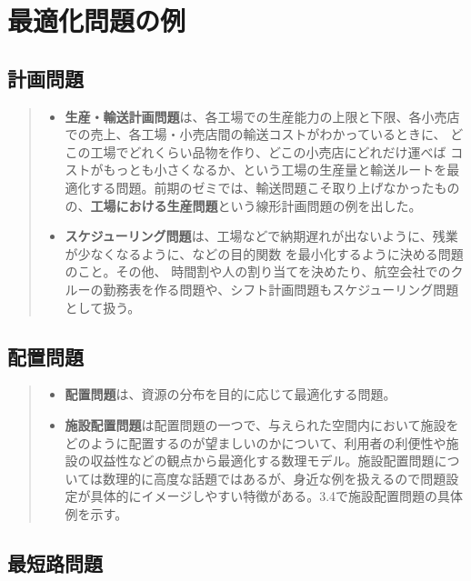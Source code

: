 \documentclass{jsarticle}
\begin{document}
\section{最適化問題の例}
\subsection{計画問題}
\begin{quote}
 	\begin{itemize}
 		 \item {\bf 生産・輸送計画問題}は、各工場での生産能力の上限と下限、各小売店での売上、各工場・小売店間の輸送コストがわかっているときに、 どこの工場でどれくらい品物を作り、どこの小売店にどれだけ運べば コストがもっとも小さくなるか、という工場の生産量と輸送ルートを最適化する問題。前期のゼミでは、輸送問題こそ取り上げなかったものの、{\bf 工場における生産問題}という線形計画問題の例を出した。
 		 \item {\bf スケジューリング問題}は、工場などで納期遅れが出ないように、残業が少なくなるように、などの目的関数 を最小化するように決める問題のこと。その他、 時間割や人の割り当てを決めたり、航空会社でのクルーの勤務表を作る問題や、シフト計画問題もスケジューリング問題として扱う。
 	\end{itemize}
\end{quote}

\subsection{配置問題}
\begin{quote}
	 \begin{itemize}
 		 \item {\bf 配置問題}は、資源の分布を目的に応じて最適化する問題。
 		 \item {\bf 施設配置問題}は配置問題の一つで、与えられた空間内において施設をどのように配置するのが望ましいのかについて、利用者の利便性や施設の収益性などの観点から最適化する数理モデル。施設配置問題\cite{配置問題}については数理的に高度な話題ではあるが、身近な例を扱えるので問題設定が具体的にイメージしやすい特徴がある。3.4で施設配置問題の具体例を示す。
	 \end{itemize}
\end{quote}


\subsection{最短路問題}
\end{document}
